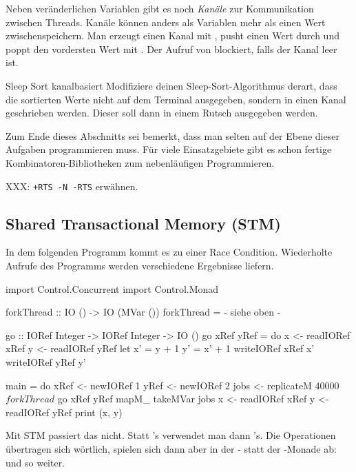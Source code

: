 \documentclass{uebblatt}
\begin{document}
Neben veränderlichen Variablen gibt es noch \emph{Kanäle} zur Kommunikation
zwischen Threads. Kanäle können anders als Variablen mehr als einen Wert
zwischenspeichern. Man erzeugt einen Kanal mit , pusht einen Wert durch  und poppt den vordersten Wert mit . Der Aufruf von  blockiert, falls der Kanal leer
ist.

\begin{aufgabe}{Sleep Sort kanalbasiert}
Modifiziere deinen Sleep-Sort-Algorithmus derart, dass die sortierten Werte
nicht auf dem Terminal ausgegeben, sondern in einen Kanal geschrieben werden.
Dieser soll dann in einem Rutsch ausgegeben werden. 
\end{aufgabe}

Zum Ende dieses Abschnitts sei bemerkt, dass man selten auf der Ebene dieser
Aufgaben programmieren muss. Für viele Einsatzgebiete gibt es schon fertige
Kombinatoren-Bibliotheken zum nebenläufigen Programmieren.

XXX: \texttt{+RTS -N -RTS} erwähnen.


\subsection{Shared Transactional Memory (STM)}

In dem folgenden Programm kommt es zu einer Race Condition. Wiederholte Aufrufe
des Programms werden verschiedene Ergebnisse liefern.

\begin{haskellcode}
import Control.Concurrent
import Control.Monad

forkThread :: IO () -> IO (MVar ())
forkThread = {- siehe oben -}

go :: IORef Integer -> IORef Integer -> IO ()
go xRef yRef = do
    x <- readIORef xRef
    y <- readIORef yRef
    let x' = y  + 1
        y' = x' + 1
    writeIORef xRef x'
    writeIORef yRef y'

main = do
    xRef <- newIORef 1
    yRef <- newIORef 2
    jobs <- replicateM 40000 $ forkThread $ go xRef yRef
    mapM_ takeMVar jobs
    x <- readIORef xRef
    y <- readIORef yRef
    print (x, y)
\end{haskellcode}

Mit STM passiert das nicht. Statt 's verwendet man dann
's. Die Operationen übertragen sich wörtlich, spielen sich
dann aber in der - statt der -Monade ab:
 und so weiter.
\end{document}

